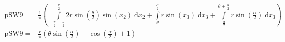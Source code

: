 \begin{align}
    \mathrm{pSW9} =&\frac{1}{\pi} \left(\;\;\int\limits_{\frac{\pi}{2} - \frac{\theta}{2}}^{\frac{\pi}{2}}2 r \sin{\left (\frac{\theta}{2} \right )} \sin{\left (x_{2} \right )}\;\mathrm{d}x_{2}+\int\limits_{\theta}^{\frac{\alpha}{2}}r \sin{\left (x_{3} \right )}\;\mathrm{d}x_{3}+\int\limits_{\frac{\alpha}{2}}^{\theta + \frac{\alpha}{2}}r \sin{\left (\frac{\alpha}{2} \right )}\;\mathrm{d}x_{3}\right)\label{pSW9Def}\\
    \mathrm{pSW9} =& \frac{r}{\pi} \left(\theta \sin{\left (\frac{\alpha}{2} \right )} - \cos{\left (\frac{\alpha}{2} \right )} + 1\right)\label{pSW9Sln}
\end{align}